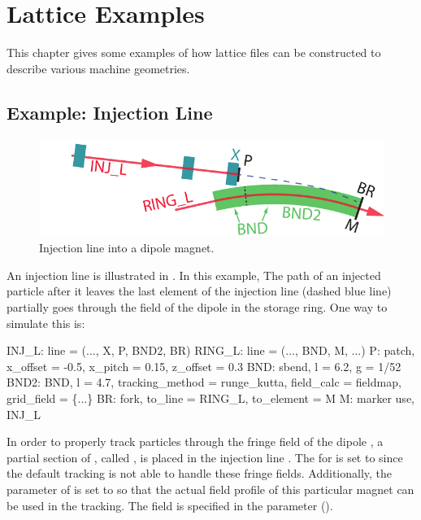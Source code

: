 \chapter{Lattice Examples}
\label{c:lat.example}

This chapter gives some examples of how lattice files can be constructed to
describe various machine geometries.

\section{Example: Injection Line}
\label{s:ex.inj}

\begin{figure}[tb]
  \centering
  \includegraphics[width=5in]{injection.pdf}
  \caption[Injection line into a dipole magnet.]{
Injection line into a dipole magnet.
  }
  \label{f:inject}
\end{figure}

An injection line is illustrated in . In this example,
The path of an injected particle after it leaves the last element
 of the injection line (dashed blue line) partially goes through
the field of the dipole  in the storage ring. One way to
simulate this is:
\begin{example}
  INJ_L: line = (..., X, P, BND2, BR)
  RING_L: line = (..., BND, M, ...)
  P: patch, x_offset = -0.5, x_pitch = 0.15, z_offset = 0.3 
  BND: sbend, l = 6.2, g = 1/52
  BND2: BND, l = 4.7, tracking_method = runge_kutta,
          field_calc = fieldmap, grid_field = \{...\}
  BR: fork, to_line = RING_L, to_element = M
  M: marker
  use, INJ_L
\end{example}

In order to properly track particles through the fringe field of the
dipole , a partial section of , called , is
placed in the injection line . The  for
 is set to  since the default
 tracking is not able to handle these fringe
fields. Additionally, the  parameter of  is
set to  so that the actual field profile of this particular
magnet can be used in the tracking. The field is specified in the
 parameter (). 

